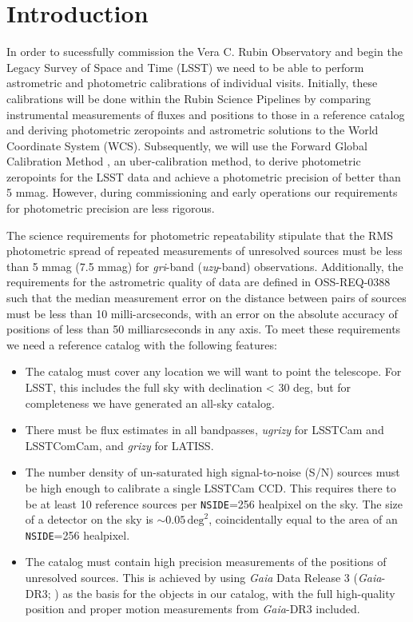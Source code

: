 \section{Introduction}
In order to sucessfully commission the Vera C. Rubin Observatory and begin the Legacy Survey of Space and Time (LSST) we need to be able to perform astrometric and photometric calibrations of individual visits.
Initially, these calibrations will be done within the Rubin Science Pipelines by comparing instrumental measurements of fluxes and positions to those in a reference catalog and deriving photometric zeropoints and astrometric solutions to the World Coordinate System (WCS).
Subsequently, we will use the Forward Global Calibration Method \citep[FGCM;][]{2018AJ....155...41B}, an uber-calibration method, to derive photometric zeropoints for the LSST data and achieve a photometric precision of better than 5 mmag.
However, during commissioning and early operations our requirements for photometric precision are less rigorous.

The science requirements for photometric repeatability \citep[OSS-REQ-0387;][]{LSE-30} stipulate that the RMS photometric spread of repeated measurements of unresolved sources must be less than 5 mmag (7.5 mmag) for \emph{gri}-band (\emph{uzy}-band) observations.
Additionally, the requirements for the astrometric quality of data are defined in OSS-REQ-0388 such that the median measurement error on the distance between pairs of sources must be less than 10 milli-arcseconds, with an error on the absolute accuracy of positions of less than 50 milliarcseconds in any axis.
To meet these requirements we need a reference catalog with the following features:

\begin{itemize}
    \item The catalog must cover any location we will want to point the telescope.
    For LSST, this includes the full sky with declination < 30 deg, but for completeness we have generated an all-sky catalog.
    \item There must be flux estimates in all bandpasses, \textit{ugrizy} for LSSTCam and LSSTComCam, and \textit{grizy} for LATISS.
    \item The number density of un-saturated high signal-to-noise (S/N) sources must be high enough to calibrate a single LSSTCam CCD.
    This requires there to be at least 10 reference sources per \texttt{NSIDE}=256 healpixel on the sky.
    The size of a detector on the sky is $\sim 0.05\,\mathrm{deg}^2$, coincidentally equal to the area of an \texttt{NSIDE}=256 healpixel.
    \item The catalog must contain high precision measurements of the positions of unresolved sources.
    This is achieved by using \textit{Gaia} Data Release 3 (\emph{Gaia}-DR3; \citealt{2023A&A...674A...1G}) as the basis for the objects in our catalog, with the full high-quality position and proper motion measurements from \textit{Gaia}-DR3 included.
\end{itemize}

